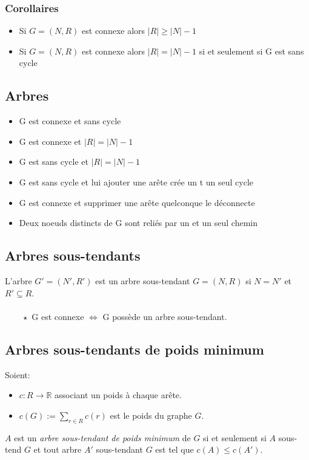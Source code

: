 \subsubsection*{Corollaires}
\begin{itemize}
\item Si $G = (N,R)$ est connexe alors $|R| \geq |N| - 1$\\
\item Si $G = (N,R)$ est connexe alors $|R| = |N| - 1$ si et seulement si G est sans cycle\\
\end{itemize}
\subsection{Arbres}
\begin{itemize}
\item G est connexe et sans cycle\\
\item G est connexe et $|R| = |N| - 1$\\
\item G est sans cycle et $|R| = |N| - 1$\\
\item G est sans cycle et lui ajouter une arête crée un t un seul cycle\\
\item G est connexe et supprimer une arête quelconque le déconnecte\\
\item Deux noeuds distincts de G sont reliés par un et un seul chemin\\
\end{itemize}
\subsection{Arbres sous-tendants}
L'arbre $G' = (N', R')$ est un arbre sous-tendant $G = (N,R)$ si $N = N'$ et $R' \subseteq R$.\\\\
$ \qquad \star$ G est connexe $\Leftrightarrow$ G possède un arbre sous-tendant.
\subsection{Arbres sous-tendants de poids minimum}
Soient:\\
\begin{itemize}
\item $c : R \rightarrow \mathbb{R}$ associant un poids à chaque arête.\\
\item $c(G) := \sum_{r \in R}c(r)$ est le poids du graphe $G$.\\
\end{itemize}
$A$ est un \emph{arbre sous-tendant de poids minimum} de $G$ si et seulement si $A$ sous-tend $G$ et tout arbre $A'$ sous-tendant $G$ est tel que $c(A) \leq c(A')$.
